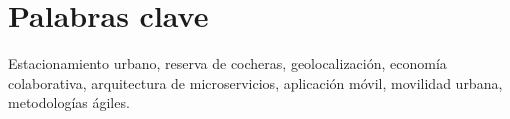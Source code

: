 \section{Palabras clave}

Estacionamiento urbano, reserva de cocheras, geolocalización, economía colaborativa, arquitectura de microservicios, aplicación móvil, movilidad urbana, metodologías ágiles.
